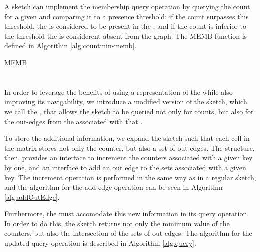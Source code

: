 
A \cm sketch can implement the membership query operation by querying the count for a given \kmer and comparing it to a presence threshold:
if the count surpasses this threshold, the \kmer is considered to be present in the \dBG, and if the count is inferior to the threshold the
\kmer is considerent absent from the graph. The MEMB function is defined in Algorithm \ref{alg:countmin-memb}.

\begin{algorithm}[htbp]
  \caption{MEMB}\label{alg:countmin-memb}
\end{algorithm}

\section{\dBCM}
\label{sec:debruijncountmin}


In order to leverage the benefits of using a \cm representation of the \dBG while also improving its navigability, we introduce a modified
version of the \cm sketch, which we call the \dBCM, that allows the sketch to be queried not only for \kmer counts, but also for the
out-edges from the \dBG associated with that \kmer.

To store the additional information, we expand the \cm sketch such that each cell in the matrix stores not only the counter,
but also a set of out edges. The structure, then, provides an interface to increment the counters associated with a given key by one,
and an interface to add an out edge to the sets associated with a given key. The increment operation is performed in the same way as in
a regular \cm sketch, and the algorithm for the add edge operation can be seen in Algorithm \ref{alg:addOutEdge}.

Furthermore, the \dBCM must accomodate this new information in its query operation. In order to do this, the sketch returns not only
the minimum value of the counters, but also the intersection of the sets of out edges. The algorithm for the updated query operation is
described in Algorithm \ref{alg:query}.

